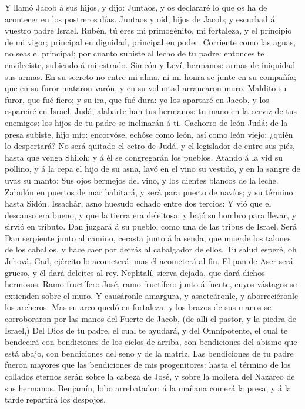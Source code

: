  Y llamó Jacob á sus hijos, y dijo: Juntaos, y os declararé
lo que os ha de acontecer en los postreros días.  Juntaos y
oid, hijos de Jacob; y escuchad á vuestro padre Israel. 
Rubén, tú eres mi primogénito, mi fortaleza, y el principio de mi vigor;
principal en dignidad, principal en poder.  Corriente como
las aguas, no seas el principal; por cuanto subiste al lecho de tu
padre: entonces te envileciste, subiendo á mi estrado. 
Simeón y Leví, hermanos: armas de iniquidad sus armas.  En
su secreto no entre mi alma, ni mi honra se junte en su compañía; que en
su furor mataron varón, y en su voluntad arrancaron muro. 
Maldito su furor, que fué fiero; y su ira, que fué dura: yo los apartaré
en Jacob, y los esparciré en Israel.  Judá, alabarte han tus
hermanos: tu mano en la cerviz de tus enemigos: los hijos de tu padre se
inclinarán á ti.  Cachorro de león Judá: de la presa
subiste, hijo mío: encorvóse, echóse como león, así como león viejo;
¿quién lo despertará?  No será quitado el cetro de Judá, y
el legislador de entre sus piés, hasta que venga Shiloh; y á él se
congregarán los pueblos.  Atando á la vid su pollino, y á
la cepa el hijo de su asna, lavó en el vino su vestido, y en la sangre
de uvas su manto:  Sus ojos bermejos del vino, y los
dientes blancos de la leche.  Zabulón en puertos de mar
habitará, y será para puerto de navíos; y su término hasta Sidón.
 Issachâr, asno huesudo echado entre dos tercios:
 Y vió que el descanso era bueno, y que la tierra era
deleitosa; y bajó su hombro para llevar, y sirvió en tributo.
 Dan juzgará á su pueblo, como una de las tribus de Israel.
 Será Dan serpiente junto al camino, cerasta junto á la
senda, que muerde los talones de los caballos, y hace caer por detrás al
cabalgador de ellos.  Tu salud esperé, oh Jehová.
 Gad, ejército lo acometerá; mas él acometerá al fin.
 El pan de Aser será grueso, y él dará deleites al rey.
 Nephtalí, sierva dejada, que dará dichos hermosos.
 Ramo fructífero José, ramo fructífero junto á fuente,
cuyos vástagos se extienden sobre el muro.  Y causáronle
amargura, y asaeteáronle, y aborreciéronle los archeros: 
Mas su arco quedó en fortaleza, y los brazos de sus manos se
corroboraron por las manos del Fuerte de Jacob, (de allí el pastor, y la
piedra de Israel,)  Del Dios de tu padre, el cual te
ayudará, y del Omnipotente, el cual te bendecirá con bendiciones de los
cielos de arriba, con bendiciones del abismo que está abajo, con
bendiciones del seno y de la matriz.  Las bendiciones de tu
padre fueron mayores que las bendiciones de mis progenitores: hasta el
término de los collados eternos serán sobre la cabeza de José, y sobre
la mollera del Nazareo de sus hermanos.  Benjamín, lobo
arrebatador: á la mañana comerá la presa, y á la tarde repartirá los
despojos.

